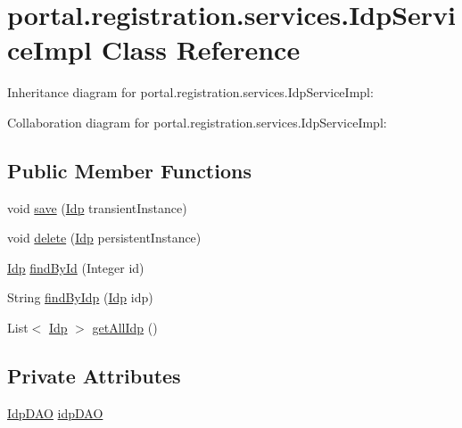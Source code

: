 \hypertarget{classportal_1_1registration_1_1services_1_1IdpServiceImpl}{
\section{portal.registration.services.IdpServiceImpl Class Reference}
\label{classportal_1_1registration_1_1services_1_1IdpServiceImpl}
}


Inheritance diagram for portal.registration.services.IdpServiceImpl:


Collaboration diagram for portal.registration.services.IdpServiceImpl:
\subsection*{Public Member Functions}
\begin{DoxyCompactItemize}
\item 
void \hyperlink{classportal_1_1registration_1_1services_1_1IdpServiceImpl_ae5a32bff76d7cfacf83a1211ddc79cc6}{save} (\hyperlink{classportal_1_1registration_1_1domain_1_1Idp}{Idp} transientInstance)
\item 
void \hyperlink{classportal_1_1registration_1_1services_1_1IdpServiceImpl_ae56e8d3a6e827ab559294bff8f68f3cb}{delete} (\hyperlink{classportal_1_1registration_1_1domain_1_1Idp}{Idp} persistentInstance)
\item 
\hyperlink{classportal_1_1registration_1_1domain_1_1Idp}{Idp} \hyperlink{classportal_1_1registration_1_1services_1_1IdpServiceImpl_a019ee67c777bd792515072a59c32e1e9}{findById} (Integer id)
\item 
String \hyperlink{classportal_1_1registration_1_1services_1_1IdpServiceImpl_a06dd428d0f1451712432d8cc63091aa1}{findByIdp} (\hyperlink{classportal_1_1registration_1_1domain_1_1Idp}{Idp} idp)
\item 
List$<$ \hyperlink{classportal_1_1registration_1_1domain_1_1Idp}{Idp} $>$ \hyperlink{classportal_1_1registration_1_1services_1_1IdpServiceImpl_a1ef0bbe03c964c5074dccdb1d9709957}{getAllIdp} ()
\end{DoxyCompactItemize}
\subsection*{Private Attributes}
\begin{DoxyCompactItemize}
\item 
\hyperlink{interfaceportal_1_1registration_1_1dao_1_1IdpDAO}{IdpDAO} \hyperlink{classportal_1_1registration_1_1services_1_1IdpServiceImpl_a3d073eb979463f04014e05bddba54d7c}{idpDAO}
\end{DoxyCompactItemize}
